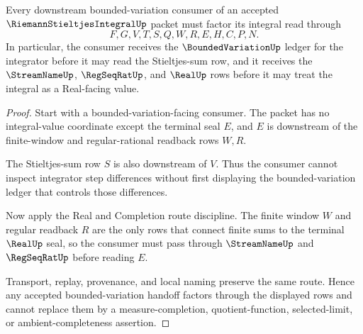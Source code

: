 \begin{theorem}
\label{thm:riemann-stieltjes-integral-bounded-variation-handoff}
Every downstream bounded-variation consumer of an accepted $\RiemannStieltjesIntegralUp$ packet must factor its integral read through
$$
F,G,V,T,S,Q,W,R,E,H,C,P,N .
$$
In particular, the consumer receives the $\BoundedVariationUp$ ledger for the integrator before it may read the Stieltjes-sum row, and it receives the $\StreamNameUp$, $\RegSeqRatUp$, and $\RealUp$ rows before it may treat the integral as a Real-facing value.
\end{theorem}
\begin{proof}
Start with a bounded-variation-facing consumer. The packet has no integral-value coordinate except the terminal seal $E$, and $E$ is downstream of the finite-window and regular-rational readback rows $W,R$.

The Stieltjes-sum row $S$ is also downstream of $V$. Thus the consumer cannot inspect integrator step differences without first displaying the bounded-variation ledger that controls those differences.

Now apply the Real and Completion route discipline. The finite window $W$ and regular readback $R$ are the only rows that connect finite sums to the terminal $\RealUp$ seal, so the consumer must pass through $\StreamNameUp$ and $\RegSeqRatUp$ before reading $E$.

Transport, replay, provenance, and local naming preserve the same route. Hence any accepted bounded-variation handoff factors through the displayed rows and cannot replace them by a measure-completion, quotient-function, selected-limit, or ambient-completeness assertion.
\end{proof}

\begin{closurestatus}{\RiemannStieltjesIntegralUp}
  \theoryclosure{\seedClosure}
  \formalstatus{\unformalizedV}
\end{closurestatus}
